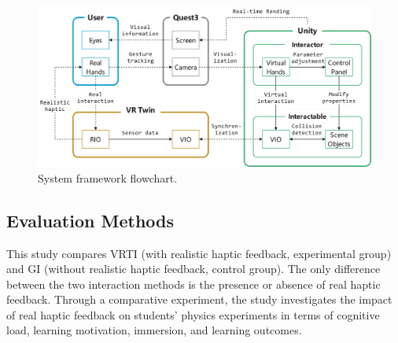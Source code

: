 \documentclass[runningheads]{llncs}
\begin{document}
\begin{figure}[t]
  \centering
  \includegraphics[width=1\textwidth]{image/system-framework-flowchart.pdf}
  \caption{System framework flowchart.}
  \label{fig:system-framework-flowchart}
\end{figure}

\subsection{Evaluation Methods}
This study compares VRTI (with realistic haptic feedback, experimental group) and GI (without realistic haptic feedback, control group). The only difference between the two interaction methods is the presence or absence of real haptic feedback. Through a comparative experiment, the study investigates the impact of real haptic feedback on students' physics experiments in terms of cognitive load, learning motivation, immersion, and learning outcomes.
\end{document}
